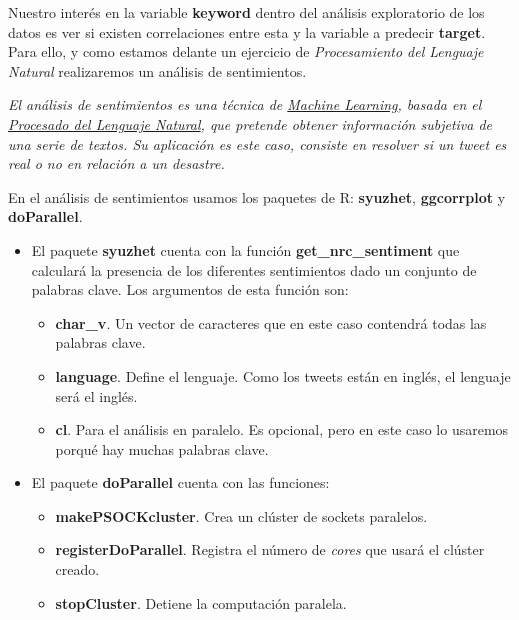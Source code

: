 \documentclass[
]{article}
\providecommand{\tightlist}{%
  \setlength{\itemsep}{0pt}\setlength{\parskip}{0pt}}
\begin{document}
Nuestro interés en la variable \textbf{keyword} dentro del análisis
exploratorio de los datos es ver si existen correlaciones entre esta y
la variable a predecir \textbf{target}. Para ello, y como estamos
delante un ejercicio de \emph{Procesamiento del Lenguaje Natural}
realizaremos un análisis de sentimientos.

\emph{El análisis de sentimientos es una técnica de
\href{https://en.wikipedia.org/wiki/Machine_learning}{Machine Learning},
basada en el
\href{https://www.kdnuggets.com/2017/02/natural-language-processing-key-terms-explained.html}{Procesado
del Lenguaje Natural}, que pretende obtener información subjetiva de una
serie de textos. Su aplicación es este caso, consiste en resolver si un
tweet es real o no en relación a un desastre.}

En el análisis de sentimientos usamos los paquetes de R:
\textbf{syuzhet}, \textbf{ggcorrplot} y \textbf{doParallel}.

\begin{itemize}
\tightlist
\item
  El paquete \textbf{syuzhet} cuenta con la función
  \textbf{get\_nrc\_sentiment} que calculará la presencia de los
  diferentes sentimientos dado un conjunto de palabras clave. Los
  argumentos de esta función son:

  \begin{itemize}
  \tightlist
  \item
    \textbf{char\_v}. Un vector de caracteres que en este caso contendrá
    todas las palabras clave.
  \item
    \textbf{language}. Define el lenguaje. Como los tweets están en
    inglés, el lenguaje será el inglés.
  \item
    \textbf{cl}. Para el análisis en paralelo. Es opcional, pero en este
    caso lo usaremos porqué hay muchas palabras clave.
  \end{itemize}
\item
  El paquete \textbf{doParallel} cuenta con las funciones:

  \begin{itemize}
  \tightlist
  \item
    \textbf{makePSOCKcluster}. Crea un clúster de sockets paralelos.
  \item
    \textbf{registerDoParallel}. Registra el número de \emph{cores} que
    usará el clúster creado.
  \item
    \textbf{stopCluster}. Detiene la computación paralela.
  \end{itemize}
\end{itemize}
\end{document}
